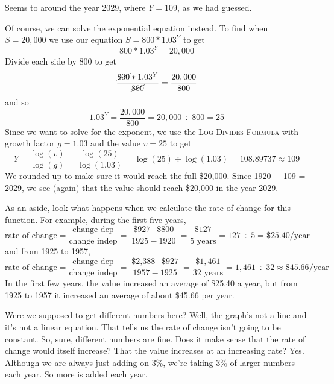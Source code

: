 Seems to around the year 2029, where $Y=109$, as we had guessed.

Of course, we can solve the exponential equation instead. To find when $S= 20,000$ we use our equation $S = 800 \ast 1.03^Y$ to get 
$$800 \ast 1.03^Y =  20,000 $$
Divide each side by 800 to get
$$ \frac{\cancel{800} \ast 1.03^Y}{\cancel{800}} = \frac{ 20,000}{800} $$
and so $$1.03^Y = \frac{ 20,000}{800}  =  20,000 \div {800} = 25$$
Since we want to solve for the exponent, we use the \textsc{Log-Divides Formula} with growth factor $g=1.03$ and the value $v= 25$ to get
$$Y =  \frac{\log (v)}{\log(g)} =  \frac{\log (25)}{\log(1.03)} = \log (25) \div \log (1.03) = 108.89737 \approx 109  $$
We rounded up to make sure it would reach the full \$20,000.  Since 1920 + 109 = 2029, we see (again) that the value should reach \$20,000 in the year 2029.

As an aside, look what happens when we calculate the rate of change for this function.  For example, during the first five years, 
$$\text{rate of change} =  \frac{\text{change dep}}{\text{change indep}} = \frac{\text{\$927} - \text{\$800}}{1925-1920}= \frac{\$127}{5 \text{ years}} = 127 \div 5 = \$25.40\text{/year}$$
and from 1925 to 1957, 
$$\text{rate of change} =  \frac{\text{change dep}}{\text{change indep}} = \frac{\text{\$2,388} - \text{\$927}}{1957-1925}= \frac{\$1,461}{32 \text{ years}} = 1,461 \div 32 \approx \$45.66\text{/year}$$
In the first few years, the value increased an average of \$25.40 a year, but from 1925 to 1957 it increased an average of about \$45.66 per year.

Were we supposed to get different numbers here?  Well, the graph's not a line and it's not a linear equation.  That tells us the rate of change isn't going to be constant.  So, sure, different numbers are fine.  Does it make sense that the rate of change would itself increase?  That the value increases at an increasing rate? Yes. Although we are always just adding on 3\%, we're taking 3\% of larger numbers each year.  So more is added each year.  

 